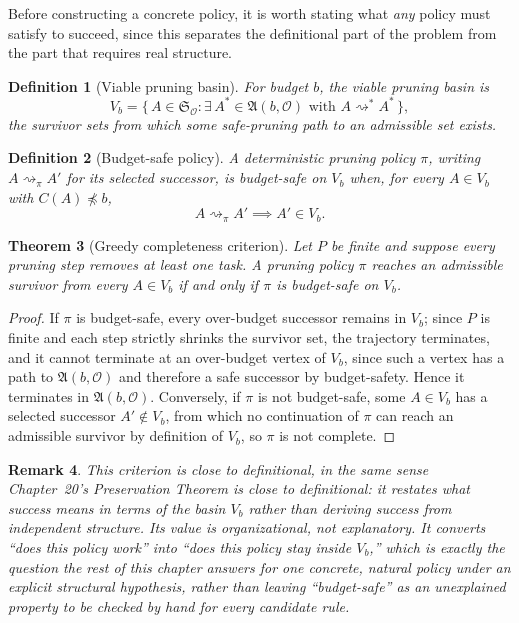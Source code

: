 \documentclass[11pt]{report}
\newtheorem{definition}{Definition}[chapter]
\newtheorem{theorem}[definition]{Theorem}
\newtheorem{remark}[definition]{Remark}
\begin{document}
Before constructing a concrete policy, it is worth stating what \emph{any} policy must satisfy to succeed, since this separates the definitional part of the problem from the part that requires real structure.

\begin{definition}[Viable pruning basin]
For budget $b$, the viable pruning basin is
\[
V_b = \{\, A \in \mathfrak S_{\mathcal O} : \exists\, A^\ast \in \mathfrak A(b, \mathcal O) \text{ with } A \rightsquigarrow^\ast A^\ast \,\},
\]
the survivor sets from which some safe-pruning path to an admissible set exists.
\end{definition}

\begin{definition}[Budget-safe policy]
A deterministic pruning policy $\pi$, writing $A \rightsquigarrow_\pi A'$ for its selected successor, is budget-safe on $V_b$ when, for every $A \in V_b$ with $C(A) \npreceq b$,
\[
A \rightsquigarrow_\pi A' \implies A' \in V_b.
\]
\end{definition}

\begin{theorem}[Greedy completeness criterion]
Let $P$ be finite and suppose every pruning step removes at least one task. A pruning policy $\pi$ reaches an admissible survivor from every $A \in V_b$ if and only if $\pi$ is budget-safe on $V_b$.
\end{theorem}
\begin{proof}
If $\pi$ is budget-safe, every over-budget successor remains in $V_b$; since $P$ is finite and each step strictly shrinks the survivor set, the trajectory terminates, and it cannot terminate at an over-budget vertex of $V_b$, since such a vertex has a path to $\mathfrak A(b, \mathcal O)$ and therefore a safe successor by budget-safety. Hence it terminates in $\mathfrak A(b, \mathcal O)$. Conversely, if $\pi$ is not budget-safe, some $A \in V_b$ has a selected successor $A' \notin V_b$, from which no continuation of $\pi$ can reach an admissible survivor by definition of $V_b$, so $\pi$ is not complete.
\end{proof}

\begin{remark}
This criterion is close to definitional, in the same sense Chapter~20's Preservation Theorem is close to definitional: it restates what success means in terms of the basin $V_b$ rather than deriving success from independent structure. Its value is organizational, not explanatory. It converts ``does this policy work'' into ``does this policy stay inside $V_b$,'' which is exactly the question the rest of this chapter answers for one concrete, natural policy under an explicit structural hypothesis, rather than leaving ``budget-safe'' as an unexplained property to be checked by hand for every candidate rule.
\end{remark}
\end{document}
